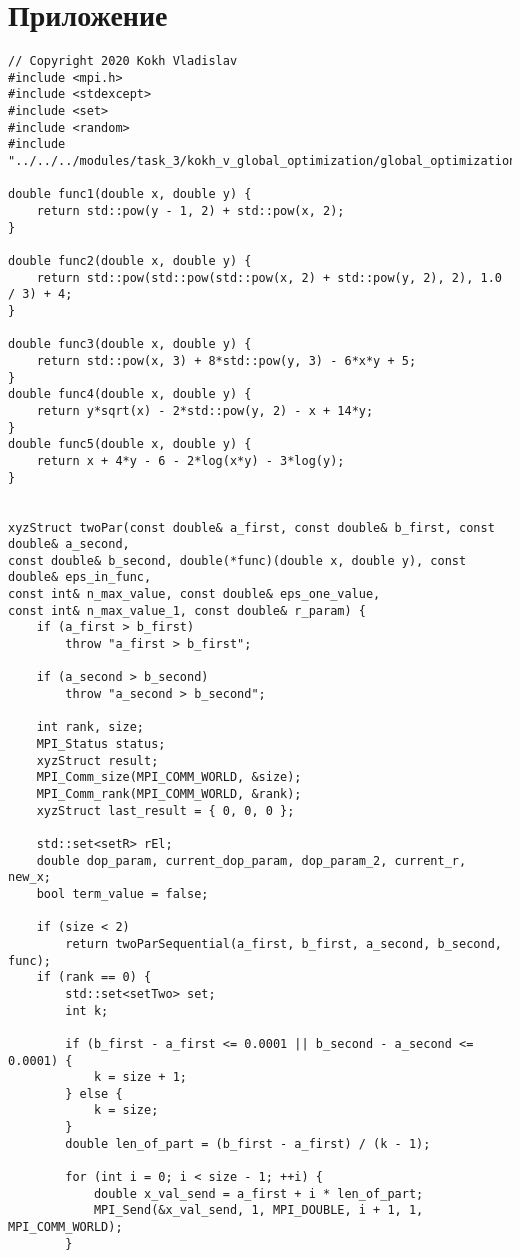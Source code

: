 \documentclass{report}
\begin{document}
\section*{Приложение}
\begin{lstlisting}
// Copyright 2020 Kokh Vladislav
#include <mpi.h>
#include <stdexcept>
#include <set>
#include <random>
#include "../../../modules/task_3/kokh_v_global_optimization/global_optimization.h"

double func1(double x, double y) {
    return std::pow(y - 1, 2) + std::pow(x, 2);
}

double func2(double x, double y) {
    return std::pow(std::pow(std::pow(x, 2) + std::pow(y, 2), 2), 1.0 / 3) + 4;
}

double func3(double x, double y) {
    return std::pow(x, 3) + 8*std::pow(y, 3) - 6*x*y + 5;
}
double func4(double x, double y) {
    return y*sqrt(x) - 2*std::pow(y, 2) - x + 14*y;
}
double func5(double x, double y) {
    return x + 4*y - 6 - 2*log(x*y) - 3*log(y);
}


xyzStruct twoPar(const double& a_first, const double& b_first, const double& a_second,
const double& b_second, double(*func)(double x, double y), const double& eps_in_func,
const int& n_max_value, const double& eps_one_value,
const int& n_max_value_1, const double& r_param) {
    if (a_first > b_first)
        throw "a_first > b_first";

    if (a_second > b_second)
        throw "a_second > b_second";

    int rank, size;
    MPI_Status status;
    xyzStruct result;
    MPI_Comm_size(MPI_COMM_WORLD, &size);
    MPI_Comm_rank(MPI_COMM_WORLD, &rank);
    xyzStruct last_result = { 0, 0, 0 };

    std::set<setR> rEl;
    double dop_param, current_dop_param, dop_param_2, current_r, new_x;
    bool term_value = false;

    if (size < 2)
        return twoParSequential(a_first, b_first, a_second, b_second, func);
    if (rank == 0) {
        std::set<setTwo> set;
        int k;

        if (b_first - a_first <= 0.0001 || b_second - a_second <= 0.0001) {
            k = size + 1;
        } else {
            k = size;
        }
        double len_of_part = (b_first - a_first) / (k - 1);

        for (int i = 0; i < size - 1; ++i) {
            double x_val_send = a_first + i * len_of_part;
            MPI_Send(&x_val_send, 1, MPI_DOUBLE, i + 1, 1, MPI_COMM_WORLD);
        }


\end{lstlisting}
\end{document}
